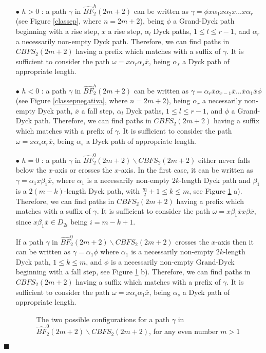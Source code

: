 \documentclass[a4paper,11pt]{article}
\newcommand{\cvd}{\hfill $\blacksquare$\bigskip}
\begin{document}
\begin{itemize}
\item[$\bullet$ $h>0$ :] a path $\gamma$ in $\hat{BF}^h_2(2m+2)$
can be written as $\gamma=\phi x \alpha_1 x \alpha_2 x \dots x
\alpha_r$ (see Figure \ref{classep}, where $n=2m+2$), being $\phi$
a Grand-Dyck path beginning with a rise step, $x$ a rise step,
$\alpha_l$ Dyck paths, $1 \leq l \leq r-1$, and $\alpha_r$ a
necessarily non-empty Dyck path. Therefore, we can find paths in
$CBFS_2(2m+2)$ having a prefix which matches with a suffix of
$\gamma$. It is sufficient to consider the path $\omega = x
\alpha_r \alpha_s \overline{x}$, being $\alpha_s$ a Dyck path of
appropriate length.

\item[$\bullet$ $h<0$ :] a path $\gamma$ in $\hat{BF}^h_2(2m+2)$
can be written as $\gamma= \alpha_r \overline{x} \alpha_{r-1}
\overline{x} \dots \overline{x} \alpha_1 \overline{x} \phi$ (see
Figure \ref{classepnegativa}, where $n=2m+2$), being $\alpha_r$ a
necessarily non-empty Dyck path, $\overline{x}$ a fall step,
$\alpha_l$ Dyck paths, $1 \leq l \leq r-1$, and $\phi$ a
Grand-Dyck path. Therefore, we can find paths in $CBFS_2(2m+2)$
having a suffix which matches with a prefix of $\gamma$. It is
sufficient to consider the path $\omega = x \alpha_s \alpha_r
\overline{x}$, being $\alpha_s$ a Dyck path of appropriate length.

\item[$\bullet$ $h=0$ :] a path $\gamma$ in $\hat{BF}^0_2(2m+2)
\backslash CBFS_2(2m+2)$ either never falls below the $x$-axis or
crosses the $x$-axis. In the first case, it can be written as
$\gamma = \alpha_1 x \beta_1 \overline{x}$, where $\alpha_1$ is a
necessarily non-empty $2k$-length Dyck path and $\beta_1$ is a
$2(m-k)$-length Dyck path, with $\frac{m}{2} + 1 \leq k \leq m$,
see Figure \ref{parparNE} a). Therefore, we can find paths in
$CBFS_2(2m+2)$ having a prefix which matches with a suffix of
$\gamma$. It is sufficient to consider the path $\omega = x
\beta_1 \overline{x} x \beta \overline{x}$, since $x \beta_1
\overline{x} \in D_{2i}$ being $i=m-k+1$.

If a path $\gamma$ in $\hat{BF}^0_2(2m+2) \backslash CBFS_2(2m+2)$
crosses the $x$-axis then it can be written as $\gamma = \alpha_1
\phi$ where $\alpha_1$ is a necessarily non-empty $2k$-length Dyck
path, $1 \leq k \leq m$, and $\phi$ is a necessarily non-empty
Grand-Dyck beginning with a fall step, see Figure \ref{parparNE}
b). Therefore, we can find paths in $CBFS_2(2m+2)$ having a suffix
which matches with a prefix of $\gamma$. It is sufficient to
consider the path $\omega = x \alpha_s \alpha_1 \overline{x}$,
being $\alpha_s$ a Dyck path of appropriate length.

\begin{figure}[!htb]
\begin{center}
 \caption{\small{The two
possible configurations for a path $\gamma$ in $\hat{BF}^0_2(2m+2)
\backslash CBFS_2(2m+2)$, for any even number $m>1$}
\label{parparNE}}\vspace{-12pt}
\end{center}
\end{figure}
\end{itemize}
\cvd
\end{document}
